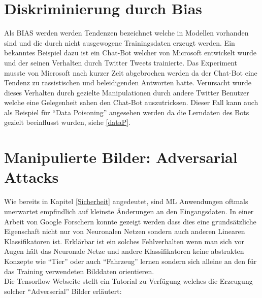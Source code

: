 \documentclass[
  12pt, %
  a4paper, %
  oneside, %
  openany, 
  numbers=noenddot, %
  BCOR=5mm, %
  parskip=half*, %
  thesis, %
]{bfhbook}
\begin{document}
\section{Diskriminierung durch Bias}
Als \Gls{BIAS} werden werden Tendenzen bezeichnet welche in Modellen vorhanden sind und die durch nicht ausgewogene Trainingsdaten erzeugt werden.
Ein bekanntes Beispiel dazu ist ein Chat-Bot welcher von Microsoft entwickelt wurde und der seinen Verhalten durch Twitter Tweets trainierte. Das Experiment musste von Microsoft nach kurzer Zeit abgebrochen werden da der Chat-Bot eine Tendenz zu rassistischen und beleidigenden Antworten hatte. Verursacht wurde dieses Verhalten durch gezielte Manipulationen durch andere Twitter Benutzer welche eine Gelegenheit sahen den Chat-Bot auszutricksen. \parencite{msTay} 
Dieser Fall kann auch als Beispiel für ``Data Poisoning'' angesehen werden da die Lerndaten des Bots gezielt beeinflusst wurden, siehe \ref{dataP}.

\section{Manipulierte Bilder: Adversarial Attacks}
Wie bereits in Kapitel \ref{Sicherheit} angedeutet, sind \Gls{ML} Anwendungen oftmals unerwartet empfindlich auf kleinste Änderungen an den Eingangsdaten. In einer Arbeit von Google Forschern   \parencite{Goodfellow2014} konnte gezeigt werden dass dies eine grundsätzliche Eigenschaft nicht nur von Neuronalen Netzen sondern auch anderen Linearen Klassifikatoren ist. Erklärbar ist ein solches Fehlverhalten wenn man sich vor Augen hält das Neuronale Netze und andere Klassifikatoren keine abstrakten Konzepte wie ``Tier'' oder auch ``Fahrzeug'' lernen sondern sich alleine an den für das Training verwendeten Bilddaten orientieren.\\
Die Tensorflow Webseite stellt ein Tutorial zu Verfügung welches die Erzeugung solcher ``Adverserial'' Bilder erläutert: \parencite{tensorflowFGSM}
\end{document}
